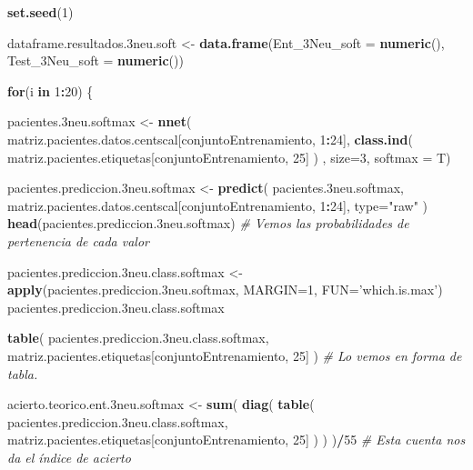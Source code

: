 \documentclass[]{article}
\newenvironment{Shaded}{\begin{snugshade}}{\end{snugshade}}
\newcommand{\KeywordTok}[1]{\textcolor[rgb]{0.13,0.29,0.53}{\textbf{#1}}}
\newcommand{\DataTypeTok}[1]{\textcolor[rgb]{0.13,0.29,0.53}{#1}}
\newcommand{\DecValTok}[1]{\textcolor[rgb]{0.00,0.00,0.81}{#1}}
\newcommand{\StringTok}[1]{\textcolor[rgb]{0.31,0.60,0.02}{#1}}
\newcommand{\CommentTok}[1]{\textcolor[rgb]{0.56,0.35,0.01}{\textit{#1}}}
\newcommand{\ControlFlowTok}[1]{\textcolor[rgb]{0.13,0.29,0.53}{\textbf{#1}}}
\newcommand{\OperatorTok}[1]{\textcolor[rgb]{0.81,0.36,0.00}{\textbf{#1}}}
\newcommand{\NormalTok}[1]{#1}
\begin{document}
\begin{Shaded}
\begin{Highlighting}[]
\KeywordTok{set.seed}\NormalTok{(}\DecValTok{1}\NormalTok{)}

\NormalTok{dataframe.resultados.3neu.soft <-}\StringTok{ }\KeywordTok{data.frame}\NormalTok{(}\DataTypeTok{Ent_3Neu_soft =} \KeywordTok{numeric}\NormalTok{(),}
                                             \DataTypeTok{Test_3Neu_soft =} \KeywordTok{numeric}\NormalTok{())}

\ControlFlowTok{for}\NormalTok{(i }\ControlFlowTok{in} \DecValTok{1}\OperatorTok{:}\DecValTok{20}\NormalTok{)}
\NormalTok{\{}

\NormalTok{  pacientes.3neu.softmax <-}\StringTok{ }\KeywordTok{nnet}\NormalTok{( matriz.pacientes.datos.centscal[conjuntoEntrenamiento, }\DecValTok{1}\OperatorTok{:}\DecValTok{24}\NormalTok{], }\KeywordTok{class.ind}\NormalTok{( matriz.pacientes.etiquetas[conjuntoEntrenamiento, }\DecValTok{25}\NormalTok{] ) , }\DataTypeTok{size=}\DecValTok{3}\NormalTok{, }\DataTypeTok{softmax =}\NormalTok{ T)}
  
\NormalTok{  pacientes.prediccion.3neu.softmax <-}\StringTok{ }\KeywordTok{predict}\NormalTok{( pacientes.3neu.softmax, matriz.pacientes.datos.centscal[conjuntoEntrenamiento, }\DecValTok{1}\OperatorTok{:}\DecValTok{24}\NormalTok{], }\DataTypeTok{type=}\StringTok{"raw"}\NormalTok{ )}
  \KeywordTok{head}\NormalTok{(pacientes.prediccion.3neu.softmax) }\CommentTok{# Vemos las probabilidades de pertenencia de cada valor}
  
  
\NormalTok{  pacientes.prediccion.3neu.class.softmax <-}\StringTok{ }\KeywordTok{apply}\NormalTok{(pacientes.prediccion.3neu.softmax, }\DataTypeTok{MARGIN=}\DecValTok{1}\NormalTok{, }\DataTypeTok{FUN=}\StringTok{'which.is.max'}\NormalTok{)}
\NormalTok{  pacientes.prediccion.3neu.class.softmax}
  
  
  \KeywordTok{table}\NormalTok{( pacientes.prediccion.3neu.class.softmax, matriz.pacientes.etiquetas[conjuntoEntrenamiento, }\DecValTok{25}\NormalTok{] )  }\CommentTok{# Lo vemos en forma de tabla.}
  
  
\NormalTok{  acierto.teorico.ent.3neu.softmax <-}\StringTok{ }\KeywordTok{sum}\NormalTok{( }\KeywordTok{diag}\NormalTok{( }\KeywordTok{table}\NormalTok{( pacientes.prediccion.3neu.class.softmax, matriz.pacientes.etiquetas[conjuntoEntrenamiento, }\DecValTok{25}\NormalTok{] ) ) )}\OperatorTok{/}\DecValTok{55} \CommentTok{# Esta cuenta nos da el índice de acierto}
  

\end{Highlighting}
\end{Shaded}
\end{document}

